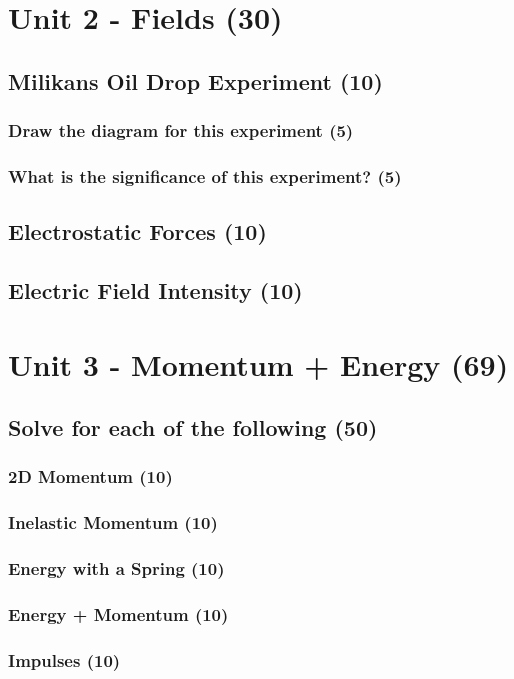 \documentclass{article}
\begin{document}
\section{Unit 2 - Fields (30)}
\subsection{Milikans Oil Drop Experiment (10)}
\subsubsection{Draw the diagram for this experiment (5)}
\subsubsection{What is the significance of this experiment? (5)}

\subsection{Electrostatic Forces (10)}
\subsection{Electric Field Intensity (10)}


\section{Unit 3 - Momentum + Energy (69)}
\subsection{Solve for each of the following (50)}
\subsubsection{2D Momentum (10)}
\subsubsection{Inelastic Momentum (10)}
\subsubsection{Energy with a Spring (10)}
\subsubsection{Energy + Momentum (10)}
\subsubsection{Impulses (10)}
\end{document}
